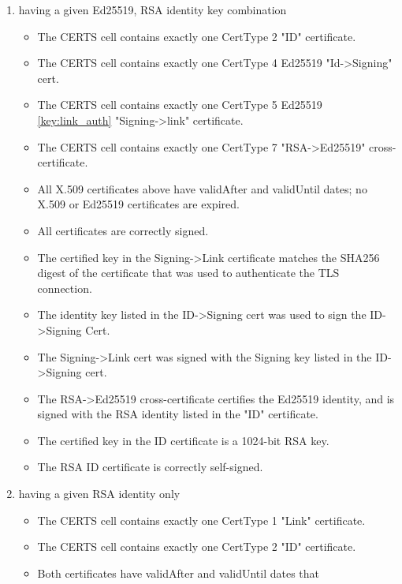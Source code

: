 \begin{enumerate}
    \item having a given Ed25519, RSA identity key combination
        \begin{itemize}
            \item The CERTS cell contains exactly one CertType 2 "ID" certificate.
            \item The CERTS cell contains exactly one CertType 4 Ed25519
            "Id->Signing" cert.
            \item The CERTS cell contains exactly one CertType 5 Ed25519 \ref{key:link_auth}
            "Signing->link" certificate.
            \item The CERTS cell contains exactly one CertType 7 "RSA->Ed25519"
            cross-certificate.
            \item All X.509 certificates above have validAfter and validUntil dates;
            no X.509 or Ed25519 certificates are expired.
            \item All certificates are correctly signed.
            \item The certified key in the Signing->Link certificate matches the
            SHA256 digest of the certificate that was used to
            authenticate the TLS connection.
            \item The identity key listed in the ID->Signing cert was used to
            sign the ID->Signing Cert.
            \item The Signing->Link cert was signed with the Signing key listed
            in the ID->Signing cert.
            \item The RSA->Ed25519 cross-certificate certifies the Ed25519
            identity, and is signed with the RSA identity listed in the
            "ID" certificate.
            \item The certified key in the ID certificate is a 1024-bit RSA key.
            \item The RSA ID certificate is correctly self-signed. 
        \end{itemize}
    \item having a given RSA identity only
        \begin{itemize}
            \item The CERTS cell contains exactly one CertType 1 "Link" certificate.
            \item The CERTS cell contains exactly one CertType 2 "ID" certificate.
            \item Both certificates have validAfter and validUntil dates that

\end{itemize}
\end{enumerate}
